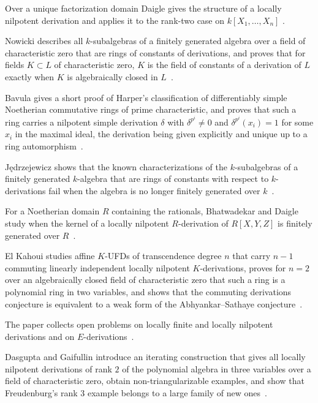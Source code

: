 Over a unique factorization domain Daigle gives the structure of a locally
nilpotent derivation and applies it to the rank-two case on $k[X_1,\dots,X_n]$
\cite[pp.~353--371]{Daigle1998LNDUFD}.

Nowicki describes all $k$-subalgebras of a finitely generated algebra over a field of characteristic zero that are rings of constants of derivations, and proves that for fields $K\subset L$ of characteristic zero, $K$ is the field of constants of a derivation of $L$ exactly when $K$ is algebraically closed in $L$~\cite{WlRingsAndFieldsOfConstantsForDe1994}.

Bavula gives a short proof of Harper's classification of differentiably simple Noetherian commutative rings of prime characteristic, and proves that such a ring carries a nilpotent simple derivation $\delta$ with $\delta^{p^i}\neq 0$ and $\delta^{p^i}(x_i)=1$ for some $x_i$ in the maximal ideal, the derivation being given explicitly and unique up to a ring automorphism~\cite{WlSimpleDerivationsOfDifferentia2008}.

J\k{e}drzejewicz shows that the known characterizations of the $k$-subalgebras of a finitely generated $k$-algebra that are rings of constants with respect to $k$-derivations fail when the algebra is no longer finitely generated over $k$~\cite{WlANoteOnCharacterizationsOfRing2004}.

For a Noetherian domain $R$ containing the rationals, Bhatwadekar and Daigle study when the kernel of a locally nilpotent $R$-derivation of $R[X,Y,Z]$ is finitely generated over $R$~\cite{WlOnFiniteGenerationOfKernelsOfL2009}.

El Kahoui studies affine $K$-UFDs of transcendence degree $n$ that carry $n-1$ commuting linearly independent locally nilpotent $K$-derivations, proves for $n=2$ over an algebraically closed field of characteristic zero that such a ring is a polynomial ring in two variables, and shows that the commuting derivations conjecture is equivalent to a weak form of the Abhyankar--Sathaye conjecture~\cite{WlUfdsWithCommutingLinearlyIndep2005}.

The paper collects open problems on locally finite and locally nilpotent derivations and on $E$-derivations~\cite{WlSomeOpenProblemsOnLocallyFinit2018}.

Dasgupta and Gaifullin introduce an iterating construction that gives all locally nilpotent derivations of rank $2$ of the polynomial algebra in three variables over a field of characteristic zero, obtain non-triangularizable examples, and show that Freudenburg's rank $3$ example belongs to a large family of new ones~\cite{WlOnLocallyNilpotentDerivationsO2025}.

